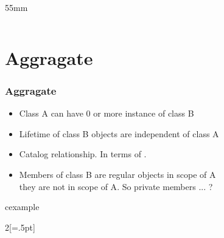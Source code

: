 \begin{frame}
\begin{columns}
\begin{column}{55mm}
\end{column}
\end{columns}
\end{frame}

\section{Aggragate}
\begin{frame}
\frametitle{Aggragate}
\begin{itemize}
\item Class A can have 0 or more instance of class B
\item Lifetime of class B objects are independent of class A
\item Catalog relationship. In terms of . 
\item Members of class B are regular objects in scope of A\\
\alert{they are not in scope of A}. So private members ... ?
\end{itemize}
\noindent
\begin{beamercolorbox}{cexample}
\begin{multicols}{2}[\columnseprule=.5pt]
\codeAggragate
\end{multicols}
\end{beamercolorbox}
\end{frame}

